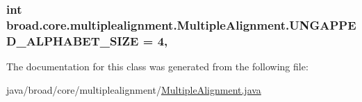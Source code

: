 \hypertarget{classbroad_1_1core_1_1multiplealignment_1_1_multiple_alignment_aab5acf6b2f8a82cb97d710a21f8711d4}{
\subsubsection[{U\+N\+G\+A\+P\+P\+E\+D\+\_\+\+A\+L\+P\+H\+A\+B\+E\+T\+\_\+\+S\+I\+Z\+E}]{\setlength{\rightskip}{0pt plus 5cm}int broad.\+core.\+multiplealignment.\+Multiple\+Alignment.\+U\+N\+G\+A\+P\+P\+E\+D\+\_\+\+A\+L\+P\+H\+A\+B\+E\+T\+\_\+\+S\+I\+Z\+E = 4\hspace{0.3cm}{\ttfamily [static]}, {\ttfamily [protected]}}}\label{classbroad_1_1core_1_1multiplealignment_1_1_multiple_alignment_aab5acf6b2f8a82cb97d710a21f8711d4}


The documentation for this class was generated from the following file\+:\begin{DoxyCompactItemize}
\item 
java/broad/core/multiplealignment/\hyperlink{_multiple_alignment_8java}{Multiple\+Alignment.\+java}\end{DoxyCompactItemize}
